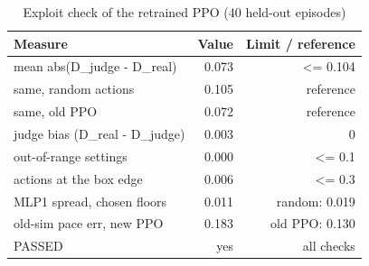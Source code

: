 \begin{table}[ht]
\centering
\small
\begin{tabular}{lrr}
\toprule
Measure & Value & Limit / reference \\
\midrule
mean abs(D\_judge - D\_real) & 0.073 & <= 0.104 \\
  same, random actions & 0.105 & reference \\
  same, old PPO & 0.072 & reference \\
judge bias (D\_real - D\_judge) & 0.003 & ~0 \\
out-of-range settings & 0.000 & <= 0.1 \\
actions at the box edge & 0.006 & <= 0.3 \\
MLP1 spread, chosen floors & 0.011 & random: 0.019 \\
old-sim pace err, new PPO & 0.183 & old PPO: 0.130 \\
PASSED & yes & all checks \\
\bottomrule
\end{tabular}
\caption{Exploit check of the retrained PPO (40 held-out episodes)}
\label{tab:ppo_exploit_check}
\end{table}
